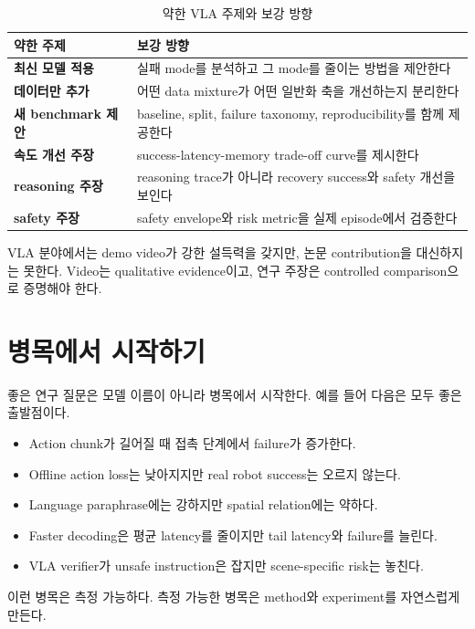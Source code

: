 \begin{table}[t]
  \centering
  \caption{약한 VLA 주제와 보강 방향}
  \label{tab:weak_vla_topics}
  \begin{tabularx}{\textwidth}{>{\bfseries}p{34mm}X}
    \toprule
    약한 주제 & 보강 방향 \\
    \midrule
    최신 모델 적용 & 실패 mode를 분석하고 그 mode를 줄이는 방법을 제안한다 \\
    데이터만 추가 & 어떤 data mixture가 어떤 일반화 축을 개선하는지 분리한다 \\
    새 benchmark 제안 & baseline, split, failure taxonomy, reproducibility를 함께 제공한다 \\
    속도 개선 주장 & success-latency-memory trade-off curve를 제시한다 \\
    reasoning 주장 & reasoning trace가 아니라 recovery success와 safety 개선을 보인다 \\
    safety 주장 & safety envelope와 risk metric을 실제 episode에서 검증한다 \\
    \bottomrule
  \end{tabularx}
\end{table}

VLA 분야에서는 demo video가 강한 설득력을 갖지만, 논문 contribution을 대신하지는 못한다. Video는 qualitative evidence이고, 연구 주장은 controlled comparison으로 증명해야 한다.

\section{병목에서 시작하기}

좋은 연구 질문은 모델 이름이 아니라 병목에서 시작한다. 예를 들어 다음은 모두 좋은 출발점이다.

\begin{itemize}
  \item Action chunk가 길어질 때 접촉 단계에서 failure가 증가한다.
  \item Offline action loss는 낮아지지만 real robot success는 오르지 않는다.
  \item Language paraphrase에는 강하지만 spatial relation에는 약하다.
  \item Faster decoding은 평균 latency를 줄이지만 tail latency와 failure를 늘린다.
  \item VLA verifier가 unsafe instruction은 잡지만 scene-specific risk는 놓친다.
\end{itemize}

이런 병목은 측정 가능하다. 측정 가능한 병목은 method와 experiment를 자연스럽게 만든다.

